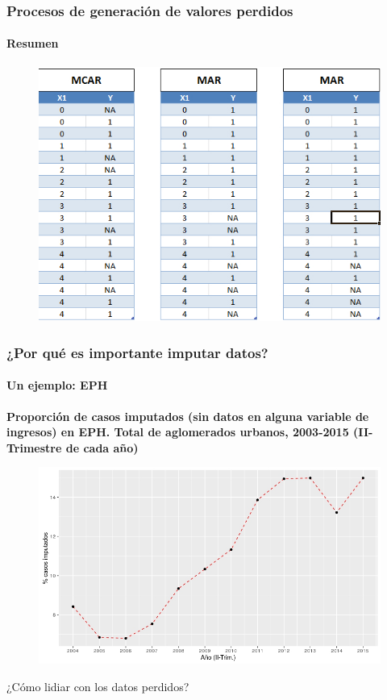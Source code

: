 \documentclass{beamer}
\begin{document}
\begin{frame}
	\frametitle{Procesos de generación de valores perdidos}
	\framesubtitle{Resumen}
	\begin{figure}
		\centering
		\includegraphics[width=0.55\linewidth, height=0.66\textheight]{img/2_patterns}
\end{figure}
\end{frame}

\begin{frame}
	\frametitle{¿Por qué es importante imputar datos?}
	\framesubtitle{Un ejemplo: EPH}
	\small{\textbf{Proporción de casos imputados (sin datos en alguna variable de ingresos) en EPH. Total de aglomerados urbanos, 2003-2015 (II-Trimestre de cada año)}}
	\begin{figure}
		\centering
		\includegraphics[width=0.7\linewidth, height=0.55\textheight]{img/4_ehp_NR}
	\end{figure}
\end{frame}

\begin{frame}
	\begin{center}
		{\huge ¿Cómo lidiar con los datos perdidos?
			\linebreak
			\linebreak
			\linebreak
			\linebreak}
	\end{center}
\end{frame}
\end{document}
